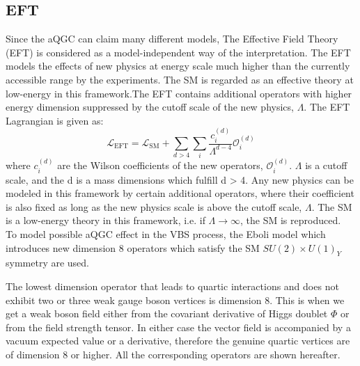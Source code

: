 \subsection{EFT}
Since the aQGC can claim many different models, The Effective Field Theory (EFT) is considered as a model-independent way of the interpretation. The EFT models the effects of new physics at energy scale much higher than the currently accessible range by the experiments. The SM is regarded as an effective theory at low-energy in this framework.The EFT contains additional operators with higher energy dimension suppressed by the cutoff scale of the new physics, $\Lambda$.
The EFT Lagrangian is given as:
\begin{equation}
\mathcal{L}_{\mathrm{EFT}}=\mathcal{L}_{\mathrm{SM}}+\sum_{d>4} \sum_{i} \frac{c_{i}^{(d)}}{\Lambda^{d-4}} \mathcal{O}_{i}^{(d)}
\end{equation}
where $c_{i}^{(d)}$ are the Wilson coefficients of the new operators, $\mathcal{O}_{i}^{(d)}$.
$\Lambda$ is a cutoff scale, and the d is a mass dimensions which fulfill d > 4.
Any new physics can be modeled in this framework by certain additional operators, where their coefficient is also fixed as long as the new physics scale is above the cutoff scale, $\Lambda$. The SM is a low-energy theory in this framework, i.e. if $\Lambda \rightarrow \infty$, the SM is reproduced.
\\

To model possible aQGC effect in the VBS process, the Eboli model \cite{eboli2006p} which introduces new dimension 8 operators which satisfy the SM $SU(2)\times U(1)_Y$ symmetry are used. 

The lowest dimension operator that leads to quartic interactions and does not exhibit two or three weak gauge boson vertices is dimension 8. 
This is when we get a weak boson field either from the covariant derivative of Higgs doublet $\Phi$ or from the field strength tensor. 
In either case the vector field is accompanied by a vacuum expected value or a derivative, therefore the genuine quartic vertices are of dimension 8 or higher.
All the corresponding operators are shown hereafter.

